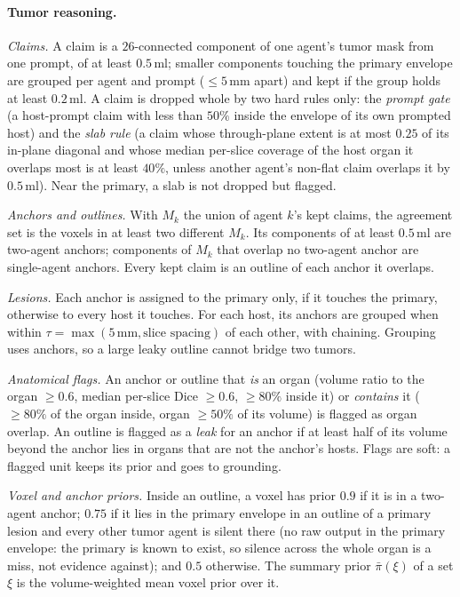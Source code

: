 \documentclass[fleqn,10pt]{olplainarticle}
\begin{document}
\paragraph{Tumor reasoning.}
\label{sec:tumor_details}
\emph{Claims.} A claim is a $26$-connected component of one agent's tumor mask from one prompt, of at least $0.5$\,ml; smaller
components touching the primary envelope are grouped per agent and prompt ($\le5$\,mm apart) and kept if the group holds at
least $0.2$\,ml. A claim is dropped whole by two hard rules only: the \emph{prompt gate} (a host-prompt claim with less than
$50\%$ inside the envelope of its own prompted host) and the \emph{slab rule} (a claim whose through-plane extent is at most
$0.25$ of its in-plane diagonal and whose median per-slice coverage of the host organ it overlaps most is at least $40\%$,
unless another agent's non-flat claim overlaps it by $0.5$\,ml). Near the primary, a slab is not dropped but flagged.

\emph{Anchors and outlines.} With $M_k$ the union of agent $k$'s kept claims, the agreement set is the voxels in at least two
different $M_k$. Its components of at least $0.5$\,ml are two-agent anchors; components of $M_k$ that overlap no two-agent
anchor are single-agent anchors. Every kept claim is an outline of each anchor it overlaps.

\emph{Lesions.} Each anchor is assigned to the primary only, if it touches the primary, otherwise to every host it touches.
For each host, its anchors are grouped when within $\tau=\max(5\,\mathrm{mm},\text{slice spacing})$ of each other, with
chaining. Grouping uses anchors, so a large leaky outline cannot bridge two tumors.

\emph{Anatomical flags.} An anchor or outline that \emph{is} an organ (volume ratio to the organ $\ge0.6$, median per-slice
Dice $\ge0.6$, $\ge80\%$ inside it) or \emph{contains} it ($\ge80\%$ of the organ inside, organ $\ge50\%$ of its volume) is
flagged as organ overlap. An outline is flagged as a \emph{leak} for an anchor if at least half of its volume beyond the
anchor lies in organs that are not the anchor's hosts. Flags are soft: a flagged unit keeps its prior and goes to grounding.

\emph{Voxel and anchor priors.} Inside an outline, a voxel has prior $0.9$ if it is in a two-agent anchor; $0.75$ if it
lies in the primary envelope in an outline of a primary lesion and every other tumor agent is silent there (no raw output in
the primary envelope: the primary is known to exist, so silence across the whole organ is a miss, not evidence against);
and $0.5$ otherwise. The summary prior $\bar\pi(\xi)$ of a set $\xi$ is the volume-weighted mean voxel prior over it.
\end{document}
